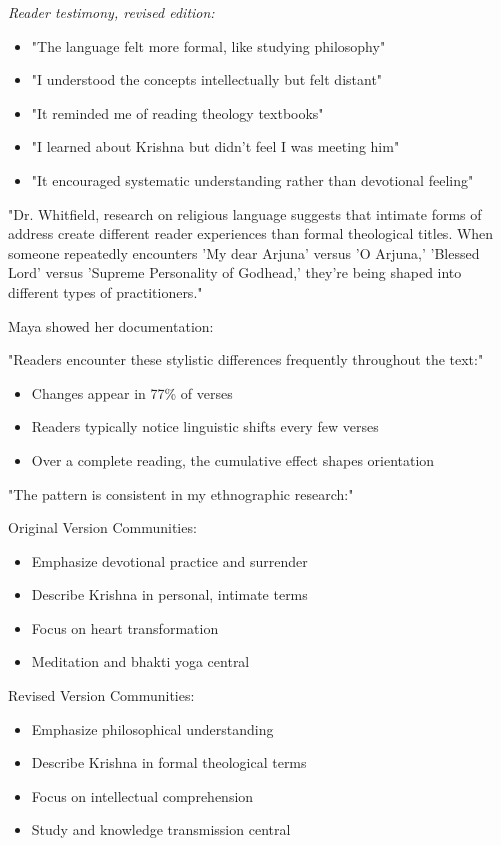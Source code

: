 \documentclass[12pt,twoside]{book}
\begin{document}
\emph{Reader testimony, revised edition:}
\begin{itemize}
\item "The language felt more formal, like studying philosophy"
\item "I understood the concepts intellectually but felt distant"
\item "It reminded me of reading theology textbooks"
\item "I learned about Krishna but didn't feel I was meeting him"
\item "It encouraged systematic understanding rather than devotional feeling"
\end{itemize}

"Dr. Whitfield, research on religious language suggests that intimate forms of address create different reader experiences than formal theological titles. When someone repeatedly encounters 'My dear Arjuna' versus 'O Arjuna,' 'Blessed Lord' versus 'Supreme Personality of Godhead,' they're being shaped into different types of practitioners."

Maya showed her documentation:

"Readers encounter these stylistic differences frequently throughout the text:"
\begin{itemize}
\item Changes appear in 77\% of verses
\item Readers typically notice linguistic shifts every few verses
\item Over a complete reading, the cumulative effect shapes orientation
\end{itemize}

"The pattern is consistent in my ethnographic research:"

Original Version Communities:
\begin{itemize}
\item Emphasize devotional practice and surrender
\item Describe Krishna in personal, intimate terms
\item Focus on heart transformation
\item Meditation and bhakti yoga central
\end{itemize}

Revised Version Communities:
\begin{itemize}
\item Emphasize philosophical understanding
\item Describe Krishna in formal theological terms
\item Focus on intellectual comprehension
\item Study and knowledge transmission central
\end{itemize}
\end{document}
